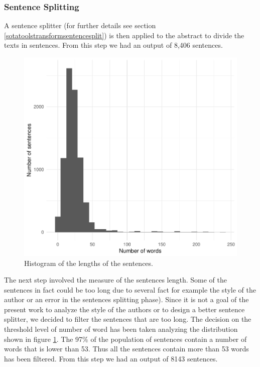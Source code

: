 \documentclass[]{book}
\theoremstyle{definition}
\theoremstyle{definition}
\theoremstyle{definition}
\theoremstyle{remark}
\begin{document}
\subsubsection*{Sentence Splitting}\label{sentence-splitting}

A sentence splitter (for further details see section
\ref{sotatoolstransformsentencesplit}) is then applied to the abstract
to divide the texts in sentences. From this step we had an output of
8,406 sentences.

\begin{figure}

{\centering \includegraphics[width=0.8\linewidth]{_bookdown_files/figures/length_histogram_bl} 

}

\caption{Histogram of the lengths of the sentences.}\label{fig:histbllength}
\end{figure}

The next step involved the measure of the sentences length. Some of the
sentences in fact could be too long due to several fact for example the
style of the author or an error in the sentences splitting phase). Since
it is not a goal of the present work to analyze the style of the authors
or to design a better sentence splitter, we decided to filter the
sentences that are too long. The decision on the threshold level of
number of word has been taken analyzing the distribution shown in figure
\ref{fig:histbllength}. The 97\% of the population of sentences contain
a number of words that is lower than 53. Thus all the sentences contain
more than 53 words has been filtered. From this step we had an output of
8143 sentences.
\end{document}
